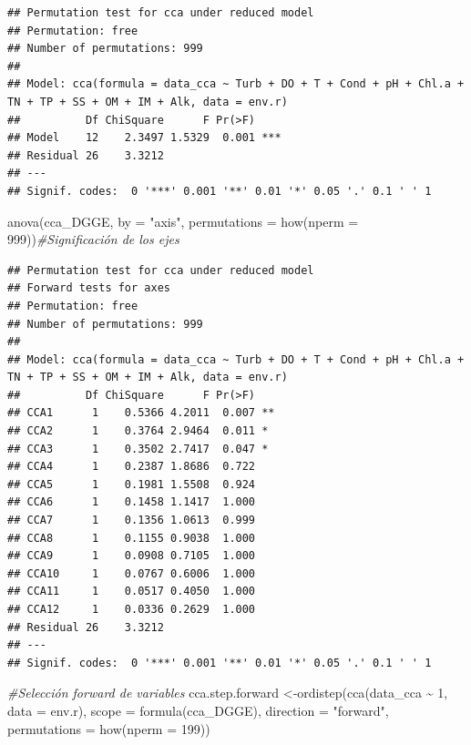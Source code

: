 \documentclass[
]{book}
\newenvironment{Shaded}{\begin{snugshade}}{\end{snugshade}}
\newcommand{\AttributeTok}[1]{\textcolor[rgb]{0.77,0.63,0.00}{#1}}
\newcommand{\CommentTok}[1]{\textcolor[rgb]{0.56,0.35,0.01}{\textit{#1}}}
\newcommand{\DecValTok}[1]{\textcolor[rgb]{0.00,0.00,0.81}{#1}}
\newcommand{\FunctionTok}[1]{\textcolor[rgb]{0.00,0.00,0.00}{#1}}
\newcommand{\NormalTok}[1]{#1}
\newcommand{\OtherTok}[1]{\textcolor[rgb]{0.56,0.35,0.01}{#1}}
\newcommand{\SpecialCharTok}[1]{\textcolor[rgb]{0.00,0.00,0.00}{#1}}
\newcommand{\StringTok}[1]{\textcolor[rgb]{0.31,0.60,0.02}{#1}}
\begin{document}
\begin{verbatim}
## Permutation test for cca under reduced model
## Permutation: free
## Number of permutations: 999
## 
## Model: cca(formula = data_cca ~ Turb + DO + T + Cond + pH + Chl.a + TN + TP + SS + OM + IM + Alk, data = env.r)
##          Df ChiSquare      F Pr(>F)    
## Model    12    2.3497 1.5329  0.001 ***
## Residual 26    3.3212                  
## ---
## Signif. codes:  0 '***' 0.001 '**' 0.01 '*' 0.05 '.' 0.1 ' ' 1
\end{verbatim}

\begin{Shaded}
\begin{Highlighting}[]
\FunctionTok{anova}\NormalTok{(cca\_DGGE, }\AttributeTok{by =} \StringTok{"axis"}\NormalTok{, }\AttributeTok{permutations =} \FunctionTok{how}\NormalTok{(}\AttributeTok{nperm =} \DecValTok{999}\NormalTok{))}\CommentTok{\#Significación de los ejes}
\end{Highlighting}
\end{Shaded}

\begin{verbatim}
## Permutation test for cca under reduced model
## Forward tests for axes
## Permutation: free
## Number of permutations: 999
## 
## Model: cca(formula = data_cca ~ Turb + DO + T + Cond + pH + Chl.a + TN + TP + SS + OM + IM + Alk, data = env.r)
##          Df ChiSquare      F Pr(>F)   
## CCA1      1    0.5366 4.2011  0.007 **
## CCA2      1    0.3764 2.9464  0.011 * 
## CCA3      1    0.3502 2.7417  0.047 * 
## CCA4      1    0.2387 1.8686  0.722   
## CCA5      1    0.1981 1.5508  0.924   
## CCA6      1    0.1458 1.1417  1.000   
## CCA7      1    0.1356 1.0613  0.999   
## CCA8      1    0.1155 0.9038  1.000   
## CCA9      1    0.0908 0.7105  1.000   
## CCA10     1    0.0767 0.6006  1.000   
## CCA11     1    0.0517 0.4050  1.000   
## CCA12     1    0.0336 0.2629  1.000   
## Residual 26    3.3212                 
## ---
## Signif. codes:  0 '***' 0.001 '**' 0.01 '*' 0.05 '.' 0.1 ' ' 1
\end{verbatim}

\begin{Shaded}
\begin{Highlighting}[]
\CommentTok{\#Selección forward de variables}
\NormalTok{cca.step.forward }\OtherTok{\textless{}{-}}\FunctionTok{ordistep}\NormalTok{(}\FunctionTok{cca}\NormalTok{(data\_cca }\SpecialCharTok{\textasciitilde{}} \DecValTok{1}\NormalTok{, }\AttributeTok{data =}\NormalTok{ env.r), }\AttributeTok{scope =} \FunctionTok{formula}\NormalTok{(cca\_DGGE),}
\AttributeTok{direction =} \StringTok{"forward"}\NormalTok{, }\AttributeTok{permutations =} \FunctionTok{how}\NormalTok{(}\AttributeTok{nperm =} \DecValTok{199}\NormalTok{))}
\end{Highlighting}
\end{Shaded}
\end{document}
